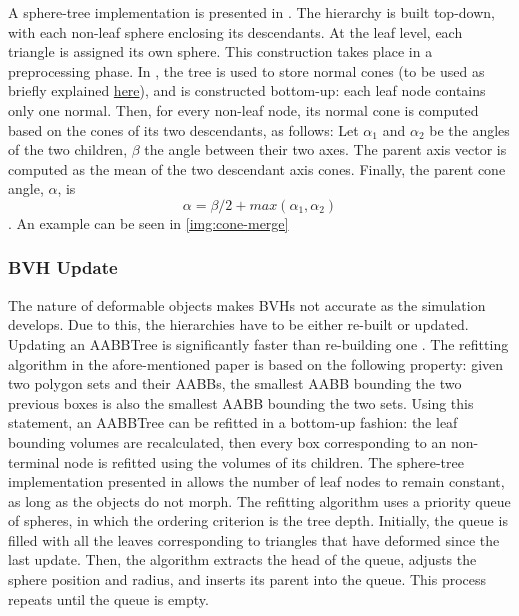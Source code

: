 A sphere-tree implementation is presented in \citep{rtsd01}. The hierarchy is built top-down, with each non-leaf sphere enclosing its descendants. At the leaf level, each triangle is assigned its own sphere. This construction takes place in a preprocessing phase. In \citep{provot97}, the tree is used to store normal cones (to be used as briefly explained \hyperref[lab:ncones]{here}), and is constructed bottom-up: each leaf node contains only one normal. Then, for every non-leaf node, its normal cone is computed based on the cones of its two descendants, as follows: Let $\alpha_{1}$ and $\alpha_{2}$ be the angles of the two children, $\beta$ the angle between their two axes. The parent axis vector is computed as the mean of the two descendant axis cones. Finally, the parent cone angle, $\alpha$, is \[\alpha = \beta / 2 + max(\alpha_{1}, \alpha_{2})\]. An example can be seen in \autoref{img:cone-merge}


\subsubsection{BVH Update}
\label{sub-sub-sec:bvhupdate}

The nature of deformable objects makes BVHs not accurate as the simulation develops. Due to this, the hierarchies have to be either re-built or updated. Updating an AABBTree is significantly faster than re-building one \citep{vdb97}. The refitting algorithm in the afore-mentioned paper is based on the following property: given two polygon sets and their AABBs, the smallest AABB bounding the two previous boxes is also the smallest AABB bounding the two sets. Using this statement, an AABBTree can be refitted in a bottom-up fashion: the leaf bounding volumes are recalculated, then every box corresponding to an non-terminal node is refitted using the volumes of its children. The sphere-tree implementation presented in \citep{rtsd01} allows the number of leaf nodes to remain constant, as long as the objects do not morph. The refitting algorithm uses a priority queue of spheres, in which the ordering criterion is the tree depth. Initially, the queue is filled with all the leaves corresponding to triangles that have deformed since the last update. Then, the algorithm extracts the head of the queue, adjusts the sphere position and radius, and inserts its parent into the queue. This process repeats until the queue is empty.

